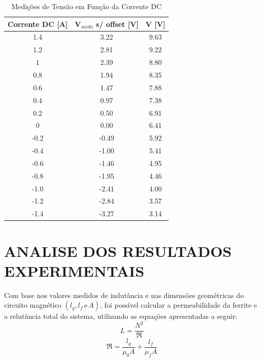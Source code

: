 \documentclass[10pt,twocolumn,letterpaper]{article}
\begin{document}
\begin{table}[htbp]
    \centering
    \caption{Medições de Tensão em Função da Corrente DC}
    \label{tab:medicoes_tensao}
    \vspace{0.25cm}
    \begin{tabular}{ccc}
        \hline
        \rule{0pt}{3ex}\textbf{Corrente DC [A]} & \textbf{V}$_{saida}$ \textbf{s/ offset [V]} & \textbf{V [V]} \\ [5pt]
        \hline
        \rule{0pt}{3ex}1.4   & 3.22 &  9.63 \\
        1.2   & 2.81 &  9.22 \\
        1     & 2.39 &  8.80 \\
        0.8   & 1.94 &  8.35 \\
        0.6   & 1.47 &  7.88 \\
        0.4   & 0.97 &  7.38 \\
        0.2   & 0.50 &  6.91 \\
        0     & 0.00 &  6.41 \\
        -0.2  & -0.49 &  5.92 \\
        -0.4  & -1.00 &  5.41 \\
        -0.6  & -1.46 &  4.95 \\
        -0.8  & -1.95 &  4.46 \\
        -1.0  & -2.41 &  4.00 \\
        -1.2  & -2.84 &  3.57 \\
        -1.4  & -3.27 &  3.14 \\ [5pt]
        \hline
    \end{tabular}
\end{table}


\section{ANALISE DOS RESULTADOS EXPERIMENTAIS}

\hspace{1cm} Com base nos valores medidos de indutância e nas dimensões geométricas do circuito magnético $(l_g, l_f \,\text{e} \, A)$, foi possível calcular a permeabilidade da ferrite e a relutância total do sistema, utilizando as equações apresentadas a seguir:
\begin{equation*}
    L = \frac{N^2}{\mathfrak{R}}
\end{equation*}
\vspace{-.25cm}
\begin{equation*}
    \mathfrak{R} = \frac{l_g}{\mu_0A} + \frac{l_f}{\mu_fA}
\end{equation*}
\end{document}
